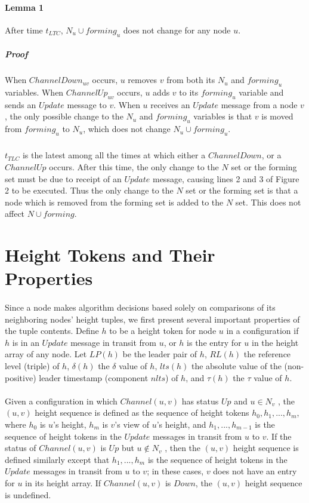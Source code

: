 \paragraph{Lemma 1}After time $t_{LTC}$, $N_u \cup forming_u$ does not change for any node $u$.
\subparagraph{Proof}When $ChannelDown_{uv}$ occurs, $u$ removes $v$ from both its $N_u$ and $forming_u$ variables. When $ChannelUp_{uv}$ occurs, $u$ adds $v$ to its $forming_u$ variable and sends an $Update$ message to $v$. When $u$ receives an $Update$ message from a node $v$, the only possible change to the $N_u$ and $forming_u$ variables is that $v$ is moved from $forming_u$ to $N_u$, which does not change $N_u \cup forming_u$.
\subparagraph{}$t_{TLC}$ is the latest among all the times at which either a $ChannelDown$, or a $ChannelUp$ occurs. After this time, the only change to the $N$ set or the forming set must be due to receipt of an $Update$ message, causing lines 2 and 3 of Figure 2 to be executed. Thus the only change to the $N$ set or the forming set is that a node which is removed from the forming set is added to the $N$ set. This does not affect $N \cup forming$.
\section{Height Tokens and Their Properties}
\paragraph{}Since a node makes algorithm decisions based solely on comparisons of its neighboring nodes' height tuples, we first present several important properties of the tuple contents. Define $h$ to be a height token for node $u$ in a configuration if $h$ is in an $Update$ message in transit from $u$, or $h$ is the entry for $u$ in the height array of any node. Let $LP(h)$ be the leader pair of $h$, $RL(h)$ the reference level (triple) of $h$, $\delta(h)$ the $\delta$ value of $h$, $lts(h)$ the absolute value of the (non-positive) leader timestamp (component $nlts$) of $h$, and $\tau (h)$ the $\tau$ value of $h$.
\paragraph{}Given a configuration in which $Channel(u, v)$ has status $Up$ and $u \in N_v$ , the $(u, v)$ height sequence is defined as the sequence of height tokens $h_0, h_1, ... , h_m$, where $h_0$ is $u$'s height, $h_m$ is $v$'s view of $u$'s height, and $h_1, ..., h_{m-1}$ is the sequence of height tokens in the $Update$ messages in transit from $u$ to $v$. If the status of $Channel(u, v)$ is $Up$ but $u \not\in N_v$ , then the $(u, v)$ height sequence is defined similarly except that $h_1, ... , h_m$ is the sequence of height tokens in the $Update$ messages in transit from $u$ to $v$; in these cases, $v$ does not have an entry for $u$ in its height array. If $Channel(u, v)$ is $Down$, the $(u, v)$ height sequence is undefined.
